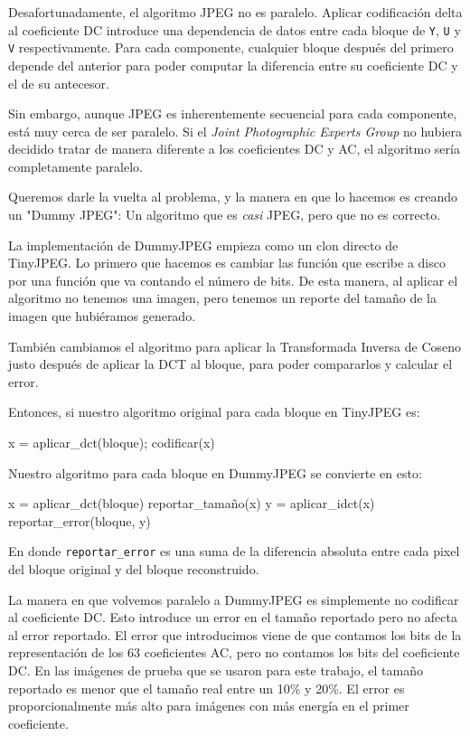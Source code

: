 Desafortunadamente, el algoritmo JPEG no es paralelo. Aplicar codificación
delta al coeficiente DC introduce una dependencia de datos entre cada bloque de
\verb+Y+, \verb+U+ y \verb+V+ respectivamente. Para cada componente, cualquier
bloque después del primero depende del anterior para poder computar la
diferencia entre su coeficiente DC  y el de su antecesor.

Sin embargo, aunque JPEG es inherentemente secuencial para cada componente,
está muy cerca de ser paralelo. Si el \emph{Joint Photographic Experts Group}
no hubiera decidido tratar de manera diferente a los coeficientes DC y AC, el
algoritmo sería completamente paralelo.

Queremos darle la vuelta al problema, y la manera en que lo hacemos es creando
un "Dummy JPEG": Un algoritmo que es \emph{casi} JPEG, pero que no es correcto.

La implementación de DummyJPEG empieza como un clon directo de TinyJPEG. Lo
primero que hacemos es cambiar las función que escribe a disco por una función
que va contando el número de bits. De esta manera, al aplicar el algoritmo no
tenemos una imagen, pero tenemos un reporte del tamaño de la imagen que
hubiéramos generado.

También cambiamos el algoritmo para aplicar la Transformada Inversa de Coseno
justo después de aplicar la DCT al bloque, para poder compararlos y calcular el
error.

Entonces, si nuestro algoritmo original para cada bloque en TinyJPEG es:

\begin{code}
    x = aplicar_dct(bloque);
    codificar(x)
\end{code}

Nuestro algoritmo para cada bloque en DummyJPEG se convierte en esto:

\begin{code}
    x = aplicar_dct(bloque)
    reportar_tamaño(x)
    y = aplicar_idct(x)
    reportar_error(bloque, y)
\end{code}

En donde \verb+reportar_error+ es una suma de la diferencia absoluta entre cada
pixel del bloque original y del bloque reconstruido.

La manera en que volvemos paralelo a DummyJPEG es simplemente no codificar al
coeficiente DC. Esto introduce un error en el tamaño reportado pero no afecta
al error reportado. El error que introducimos viene de que contamos los bits de
la representación de los 63 coeficientes AC, pero no contamos los bits del
coeficiente DC. En las imágenes de prueba que se usaron para este trabajo, el
tamaño reportado es menor que el tamaño real entre un 10\% y 20\%. El error es
proporcionalmente más alto para imágenes con más energía en el primer
coeficiente.

